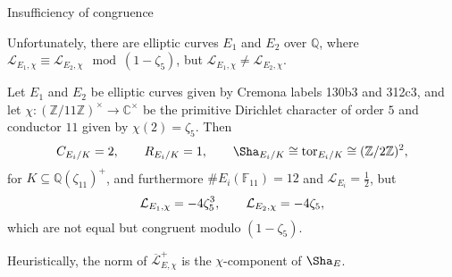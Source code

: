 \documentclass[10pt]{beamer}
\begin{document}
\begin{frame}[t]{Insufficiency of congruence}

Unfortunately, there are elliptic curves $ E_1 $ and $ E_2 $ over $ \mathbb{Q} $, where $ \mathcal{L}_{E_1, \chi} \equiv \mathcal{L}_{E_2, \chi} \mod (1 - \zeta_5) $, but $ \mathcal{L}_{E_1, \chi} \ne \mathcal{L}_{E_2, \chi} $.

\pause

\vspace{0.5cm}

\begin{example}[A.]
Let $ E_1 $ and $ E_2 $ be elliptic curves given by Cremona labels 130b3 and 312c3, and let $ \chi : (\mathbb{Z} / 11\mathbb{Z})^\times \to \mathbb{C}^\times $ be the primitive Dirichlet character of order $ 5 $ and conductor $ 11 $ given by $ \chi(2) = \zeta_5 $. \pause Then
\vspace{-0.2cm} $$ \vspace{-0.2cm} C_{E_i / K} = 2, \qquad R_{E_i / K} = 1, \qquad \Sha_{E_i / K} \cong \mathrm{tor}_{E_i / K} \cong (\mathbb{Z} / 2\mathbb{Z})^2, $$
for $ K \subseteq \mathbb{Q}(\zeta_{11})^+ $, \pause and furthermore $ \#E_i(\mathbb{F}_{11}) = 12 $ and $ \mathcal{L}_{E_i} = \tfrac{1}{2} $, \pause but
\vspace{-0.2cm} $$ \vspace{-0.2cm} \mathcal{L}_{E_1, \chi} = -4\zeta_5^3, \qquad \mathcal{L}_{E_2, \chi} = -4\zeta_5, $$
which are not equal but congruent modulo $ (1 - \zeta_5) $.
\end{example}

\pause

\vspace{0.5cm} Heuristically, the norm of $ \overline{\mathcal{L}}_{E, \chi}^+ $ is the $ \chi $-component of $ \Sha_E $.

\end{frame}
\end{document}
